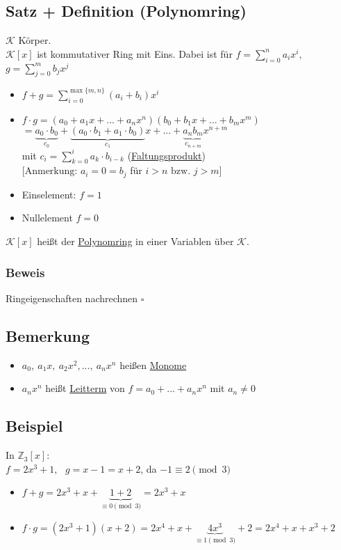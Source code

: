 \documentclass[a4paper, 12pt,titlepage, pdf, headsepline]{article}
\newcommand{\uline}[1]{\underline{#1}}
\newcommand{\qed}{\hfill$\square$}
\renewcommand{\>}{\rightarrow}
\renewcommand{\*}{\cdot}
\begin{document}
		      	\subsection{Satz + Definition (Polynomring)}
		      	$\mathcal{K}$ Körper.\\
		      	$\mathcal{K}[x]$ ist kommutativer Ring mit Eins. Dabei ist für $f = \sum_{i=0}^{n}a_ix^i,$\\$g = \sum_{j = 0}^{m} b_j x^j$
		      	\begin{itemize}
		      		\item $f+g = \sum_{i = 0}^{\max\{m,n\}} (a_i + b_i)x^i$
		      		\item $f \cdot g  = (a_0 + a_1x + ... + a_nx^n)(b_0 + b_1x + ... + b_mx^m)$\\
		      		      \noindent\hspace*{8.5mm}$= \underbrace{a_0 \cdot b_0}_{c_0} + \underbrace{(a_0 \cdot b_1 + a_1 \cdot b_0)}_{c_1}x + ... + \underbrace{a_nb_m}_{c_{n+m}}x^{n+m}$\\
		      		      mit $c_i = \sum_{k = 0}^{i}a_k \cdot b_{i-k}$ (\uline{Faltungsprodukt})\\
		      		      $[\textrm{Anmerkung: }a_i = 0 = b_j$ für $i>n\textrm{ bzw. }j>m]$	
		      		\item Einselement: $f=1$
		      		\item Nullelement $f = 0$
		      	\end{itemize}
		      	$\mathcal{K}[x]$ heißt der \uline{Polynomring} in einer Variablen über $\mathcal{K}$.\\
		      	\subsubsection*{Beweis}
		      	Ringeigenschaften nachrechnen \qed
		      	\subsection{Bemerkung}
		      	\begin{itemize}
		      		\item $a_0,~a_1x,~a_2x^2,...,~a_nx^n$ heißen \uline{Monome}
		      		\item $a_nx^n$ heißt \uline{Leitterm} von $f= a_0 + ... + a_nx^n$ mit $ a_n \neq 0$
		      	\end{itemize}
		      	\subsection{Beispiel}
		      	In $\mathds{Z}_3[x]$: \\
		      	$f = 2x^3 +1,~~~ g = x-1 = x +2$, da $-1 \equiv 2\pmod 3$
		      	\begin{itemize}
		      		\item $f+g = 2x^3 + x + \underbrace{1+2}_{\equiv 0 \pmod 3} = 2x^3 + x$
		      		\item $f \cdot g = (2x^3 + 1)(x+2) = 2x^4 + x + \underbrace{4x^3}_{\equiv 1\pmod{3}} + 2 = 2x^4 + x + x^3 + 2$
		      	\end{itemize}
\end{document}
